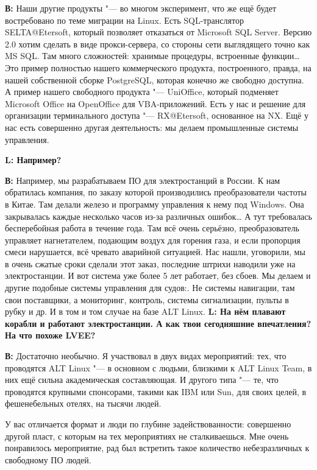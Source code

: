 \documentclass[10pt, a5paper]{article}
\begin{document}
{\noindent \bf В:} Наши другие продукты "--- во многом эксперимент, что же ещё будет востребовано по теме миграции на Linux. Есть SQL-транслятор SELTA@Etersoft, который позволяет отказаться от Microsoft SQL Server. Версию 2.0 хотим сделать в виде прокси-сервера, со стороны сети выглядящего точно как MS SQL. Там много сложностей: хранимые процедуры, встроенные функции\ldots Это пример полностью нашего коммерческого продукта, построенного, правда, на нашей собственной сборке PostgreSQL, которая конечно же свободно доступна. А пример нашего свободного продукта "--- UniOffice, который  подменяет Microsoft Office на OpenOffice для VBA-приложений. Есть у нас и решение для организации терминального доступа "--- RX@Etersoft, основанное на NX. Ещё у нас есть совершенно другая деятельность: мы делаем промышленные системы управления. 

{\noindent \bf L: Например?}

{\noindent \bf В:} Например, мы разрабатываем ПО для электростанций в России. К нам обратилась компания, по заказу которой производились преобразователи частоты в Китае. Там делали железо и программу управления к нему под Windows. Она закрывалась каждые несколько часов из-за различных ошибок… А тут требовалась бесперебойная работа в течение года. Там всё очень серьёзно, преобразователь управляет нагнетателем, подающим воздух для горения газа, и если пропорция смеси нарушается, всё чревато аварийной ситуацией. Нас нашли, уговорили, мы в очень сжатые сроки сделали этот заказ, последние штрихи наводили уже на электростанции. И вот система уже более 5 лет работает, без сбоев. Мы делаем и другие подобные системы управления для судов:. Не системы навигации, там свои поставщики, а мониторинг, контроль, системы сигнализации, пульты в рубку и др. И в том и том случае на базе ALT Linux. 
\longpage
{\noindent \bf L: На нём плавают корабли и работают электростанции. А как твои сегодняшние впечатления? На что похоже LVEE?}

{\noindent \bf В:} Достаточно необычно. Я участвовал в двух видах мероприятий: тех, что проводятся ALT Linux "--- в основном с людьми, близкими к ALT Linux Team, в них ещё сильна академическая составляющая. И другого типа "--- те, что проводятся крупными спонсорами, такими как IBM или Sun, для своих целей, в фешенебельных отелях,  на тысячи людей.

У вас отличается формат и люди по глубине задействованности: совершенно другой пласт, с которым на тех мероприятиях не сталкиваешься. Мне очень понравилось мероприятие, рад был встретить такое количество небезразличных к свободному ПО людей.
\end{document}
